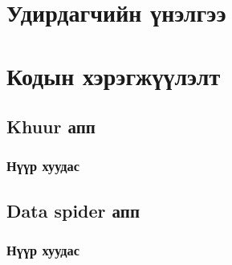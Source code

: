 
\appendix
{}

\chapter{Удирдагчийн үнэлгээ}
\chapter{Кодын хэрэгжүүлэлт}

\section{Khuur апп}

\subsection{Нүүр хуудас}
\section{Data spider апп}

\subsection{Нүүр хуудас}
\pagebreak